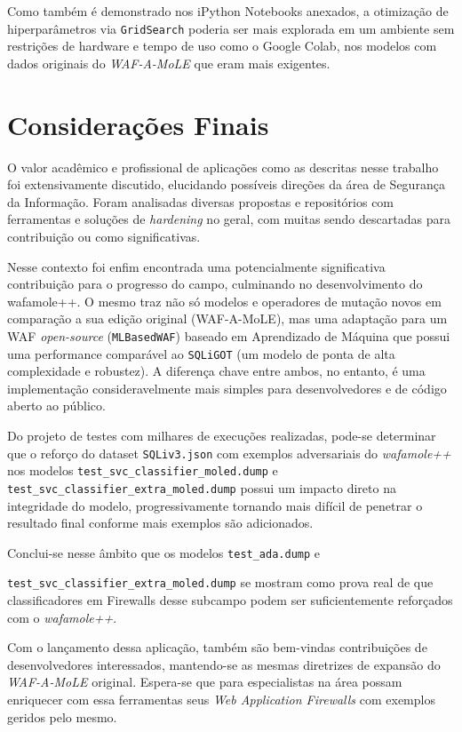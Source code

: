 Como também é demonstrado nos iPython Notebooks anexados, a otimização de hiperparâmetros via \verb+GridSearch+ poderia ser mais explorada em um ambiente sem restrições de hardware e tempo de uso como o Google Colab, nos modelos com dados originais do \textit{WAF-A-MoLE} que eram mais exigentes. 

\section{Considerações Finais}
O valor acadêmico e profissional de aplicações como as descritas nesse trabalho foi extensivamente discutido, elucidando possíveis direções da área de Segurança da Informação. Foram analisadas diversas propostas e repositórios com ferramentas e soluções de \textit{hardening} no geral, com muitas sendo descartadas para contribuição ou como significativas. 

Nesse contexto foi enfim encontrada uma potencialmente significativa contribuição para o progresso do campo, culminando no desenvolvimento do wafamole++. O mesmo traz não só modelos e operadores de mutação novos em comparação a sua edição original (WAF-A-MoLE), mas uma adaptação para um WAF \textit{open-source}  (\verb+MLBasedWAF+) baseado em Aprendizado de Máquina que possui uma performance comparável ao \verb+SQLiGOT+ (um modelo de ponta de alta complexidade e robustez). A diferença chave entre ambos, no entanto, é uma implementação consideravelmente mais simples para desenvolvedores e de código aberto ao público.

Do projeto de testes com milhares de execuções realizadas, pode-se determinar que o reforço do dataset \verb+SQLiv3.json+ com exemplos adversariais do \textit{wafamole++} nos modelos \verb+test_svc_classifier_moled.dump+ e \verb+test_svc_classifier_extra_moled.dump+ possui um impacto direto na integridade do modelo, progressivamente tornando mais difícil de penetrar o resultado final conforme mais exemplos são adicionados.

Conclui-se nesse âmbito que os modelos \verb+test_ada.dump+ e 

\verb+test_svc_classifier_extra_moled.dump+ se mostram como prova real de que classificadores em Firewalls desse subcampo podem ser suficientemente reforçados com o \textit{wafamole++}.

Com o lançamento dessa aplicação, também são bem-vindas contribuições de desenvolvedores interessados, mantendo-se as mesmas diretrizes de expansão do \textit{WAF-A-MoLE} original. Espera-se que para especialistas na área possam enriquecer com essa ferramentas seus \textit{Web Application Firewalls}  com exemplos geridos pelo mesmo.
